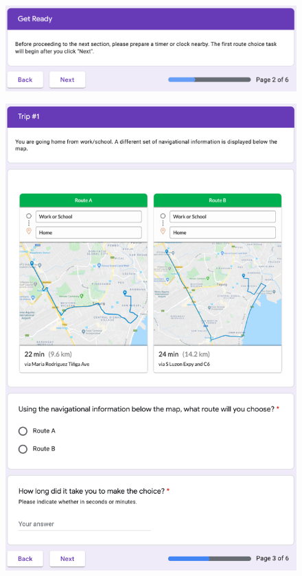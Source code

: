 \begin{figure}[h]
  \centering
  \includegraphics[scale=0.6]{figures/f-daily3.png}
\end{figure}

\begin{figure}[h]
  \centering
  \includegraphics[scale=0.6]{figures/f-daily4.png}
\end{figure}
